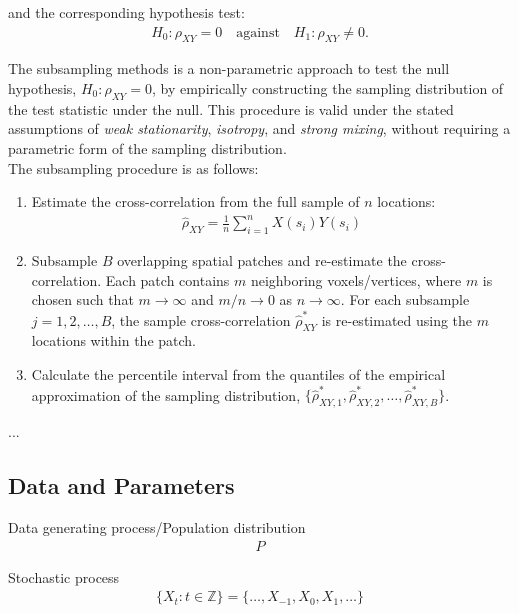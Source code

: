 \documentclass[9pt]{article}
\begin{document}
\noindent and the corresponding hypothesis test:
\begin{align}
    H_0: \rho_{XY} = 0 \quad\text{against}\quad H_1:\rho_{XY} \ne 0.
\end{align}

The subsampling methods is a non-parametric approach to test the null hypothesis, $H_0: \rho_{XY} = 0$, by empirically constructing the sampling distribution of the test statistic under the null. This procedure is valid under the stated assumptions of \textit{weak stationarity}, \textit{isotropy}, and \textit{strong mixing}, without requiring a parametric form of the sampling distribution.\\

The subsampling procedure is as follows:

\begin{enumerate}
    \item Estimate the cross-correlation from the full sample of $n$ locations:
    \begin{align}
        \hat\rho_{XY} = \frac{1}{n} \sum_{i=1}^n X(s_i) Y(s_i)
    \end{align}

    \item Subsample $B$ overlapping spatial patches and re-estimate the cross-correlation. Each patch contains $m$ neighboring voxels/vertices, where $m$ is chosen such that $m\to\infty$ and $m/n \to 0$ as $n\to\infty$. For each subsample $j=1, 2, \dots, B$, the sample cross-correlation $\hat\rho^*_{XY}$ is re-estimated using the $m$ locations within the patch. 

    \item Calculate the percentile interval from the quantiles of the empirical approximation of the sampling distribution, $\{\hat\rho^*_{XY, 1}, \hat\rho^*_{XY, 2}, \dots, \hat\rho^*_{XY, B}\}$.
\end{enumerate}

...\\

\subsection*{Data and Parameters}

Data generating process/Population distribution
\begin{align}
    P
\end{align}

Stochastic process
\begin{align}
    \{X_t: t\in\mathbb{Z}\} = \{\dots, X_{-1}, X_0, X_1, \dots\}
\end{align}
\end{document}
